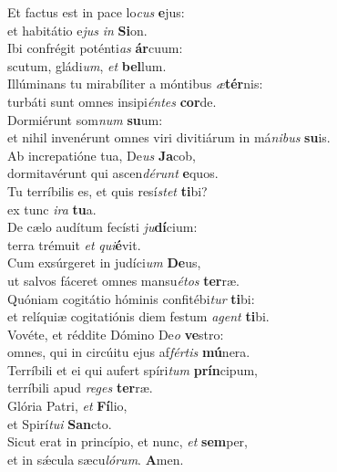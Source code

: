 \evenverse Et factus est in pace lo\textit{cus} \textbf{e}jus:~\*\\
\evenverse et habitátio e\textit{jus} \textit{in} \textbf{Si}on.\\
\oddverse Ibi confrégit poténti\textit{as} \textbf{ár}cuum:~\*\\
\oddverse scutum, gládi\textit{um}, \textit{et} \textbf{bel}lum.\\
\evenverse Illúminans tu mirabíliter a móntibus \textit{æ}\textbf{tér}nis:~\*\\
\evenverse turbáti sunt omnes insipi\textit{én}\textit{tes} \textbf{cor}de.\\
\oddverse Dormiérunt som\textit{num} \textbf{su}um:~\*\\
\oddverse et nihil invenérunt omnes viri divitiárum in má\textit{ni}\textit{bus} \textbf{su}is.\\
\evenverse Ab increpatióne tua, De\textit{us} \textbf{Ja}cob,~\*\\
\evenverse dormitavérunt qui ascen\textit{dé}\textit{runt} \textbf{e}quos.\\
\oddverse Tu terríbilis es, et quis resí\textit{stet} \textbf{ti}bi?~\*\\
\oddverse ex tunc \textit{i}\textit{ra} \textbf{tu}a.\\
\evenverse De cælo audítum fecísti \textit{ju}\textbf{dí}cium:~\*\\
\evenverse terra trémuit \textit{et} \textit{qui}\textbf{é}vit.\\
\oddverse Cum exsúrgeret in judíci\textit{um} \textbf{De}us,~\*\\
\oddverse ut salvos fáceret omnes mansu\textit{é}\textit{tos} \textbf{ter}ræ.\\
\evenverse Quóniam cogitátio hóminis confitébi\textit{tur} \textbf{ti}bi:~\*\\
\evenverse et relíquiæ cogitatiónis diem festum \textit{a}\textit{gent} \textbf{ti}bi.\\
\oddverse Vovéte, et réddite Dómino De\textit{o} \textbf{ve}stro:~\*\\
\oddverse omnes, qui in circúitu ejus af\textit{fér}\textit{tis} \textbf{mú}nera.\\
\evenverse Terríbili et ei qui aufert spíri\textit{tum} \textbf{prín}cipum,~\*\\
\evenverse terríbili apud \textit{re}\textit{ges} \textbf{ter}ræ.\\
\oddverse Glória Patri, \textit{et} \textbf{Fí}lio,~\*\\
\oddverse et Spirí\textit{tu}\textit{i} \textbf{San}cto.\\
\evenverse Sicut erat in princípio, et nunc, \textit{et} \textbf{sem}per,~\*\\
\evenverse et in sǽcula sæcu\textit{ló}\textit{rum}. \textbf{A}men.\\
